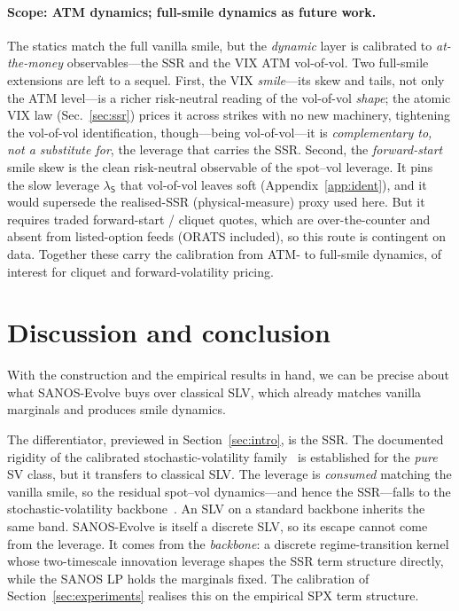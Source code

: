 \documentclass[11pt]{article}
\begin{document}
\paragraph{Scope: ATM dynamics; full-smile dynamics as future work.} The statics match the full vanilla
smile, but the \emph{dynamic} layer is calibrated to \emph{at-the-money} observables---the SSR and the VIX
ATM vol-of-vol. Two full-smile extensions are left to a sequel. First, the VIX \emph{smile}---its skew and
tails, not only the ATM level---is a richer risk-neutral reading of the vol-of-vol \emph{shape}; the atomic
VIX law (Sec.~\ref{sec:ssr}) prices it across strikes with no new machinery, tightening the vol-of-vol
identification, though---being vol-of-vol---it is \emph{complementary to, not a substitute for}, the leverage
that carries the SSR. Second, the \emph{forward-start} smile skew is the clean risk-neutral observable of the
spot--vol leverage. It pins the slow leverage $\lambda_{\mathsf S}$ that vol-of-vol leaves soft
(Appendix~\ref{app:ident}), and it would supersede the realised-SSR (physical-measure) proxy used
here. But it requires traded forward-start / cliquet quotes, which are over-the-counter and absent
from listed-option feeds (ORATS included), so this route is contingent on data. Together these carry the calibration from ATM- to
full-smile dynamics, of interest for cliquet and forward-volatility pricing.

\section{Discussion and conclusion}
\label{sec:positioning}
With the construction and the empirical results in hand, we can be precise about what
SANOS-Evolve buys over classical SLV, which already matches vanilla marginals and produces
smile dynamics.

The differentiator, previewed in Section~\ref{sec:intro}, is the SSR. The documented rigidity of the calibrated stochastic-volatility
family~\cite{bourgey2024,frizgatheral2024} is established for the \emph{pure} SV class, but it
transfers to classical SLV. The leverage is \emph{consumed} matching the vanilla smile, so the
residual spot--vol dynamics---and hence the SSR---falls to the stochastic-volatility
backbone~\cite{bergomi2017,guyonhl2012}. An SLV on a standard backbone inherits the same band. SANOS-Evolve is itself a discrete SLV, so its escape cannot come from the leverage. It comes
from the \emph{backbone}: a discrete regime-transition kernel whose two-timescale innovation
leverage shapes the SSR term structure directly, while the SANOS LP holds the marginals fixed. The
calibration of Section~\ref{sec:experiments} realises this on the empirical SPX term structure.
\end{document}
